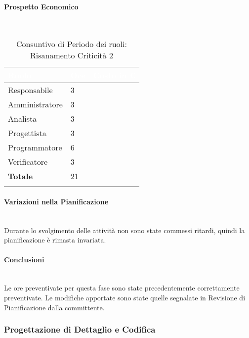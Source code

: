 \paragraph{Prospetto Economico} \-\\

\begin{longtable}{| C{.30\textwidth}| C{.15\textwidth}| C{.20\textwidth}|}
	\hline
	\textbf{\textcolor{white}{Ruolo}} & \textbf{\textcolor{white}{Ore}} & \textbf{\textcolor{white}{Costo 	in \euro}} \\
	\hline 
	Responsabile & 3 &  \\
	\hline
	Amministratore & 3 &  \\
	\hline
	Analista & 3 &  \\
	\hline
	Progettista & 3 & \\
	\hline
	Programmatore & 6 &  \\
	\hline 
	Verificatore & 3 &  \\
	\hline
	\textbf{Totale} & 21 &  \\
	\hline 

\caption{Consuntivo di Periodo dei ruoli: Risanamento Criticità 2}
\label{Distribuzione ruoli RC2}
\end{longtable}

\paragraph{Variazioni nella Pianificazione} ~\\
Durante lo svolgimento delle attività non sono state commessi ritardi, quindi la pianificazione è rimasta invariata.

\paragraph{Conclusioni} ~\\

Le ore preventivate per questa fase sono state precedentemente correttamente preventivate. Le modifiche apportate sono state quelle segnalate in Revisione di Pianificazione dalla committente. 

\pagebreak

\subsubsection{Progettazione di Dettaglio e Codifica}
\label{PPDC}
